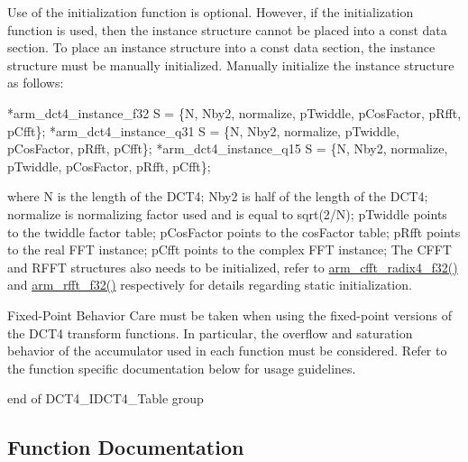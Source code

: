 \begin{DoxyParagraph}{}
Use of the initialization function is optional. However, if the initialization function is used, then the instance structure cannot be placed into a const data section. To place an instance structure into a const data section, the instance structure must be manually initialized. Manually initialize the instance structure as follows\+: 
\begin{DoxyPre}
*arm\_dct4\_instance\_f32 S = \{N, Nby2, normalize, pTwiddle, pCosFactor, pRfft, pCfft\};
*arm\_dct4\_instance\_q31 S = \{N, Nby2, normalize, pTwiddle, pCosFactor, pRfft, pCfft\};
*arm\_dct4\_instance\_q15 S = \{N, Nby2, normalize, pTwiddle, pCosFactor, pRfft, pCfft\};
  \end{DoxyPre}
 where {\ttfamily N} is the length of the D\+C\+T4; {\ttfamily Nby2} is half of the length of the D\+C\+T4; {\ttfamily normalize} is normalizing factor used and is equal to {\ttfamily sqrt(2/N)}; {\ttfamily p\+Twiddle} points to the twiddle factor table; {\ttfamily p\+Cos\+Factor} points to the cos\+Factor table; {\ttfamily p\+Rfft} points to the real F\+FT instance; {\ttfamily p\+Cfft} points to the complex F\+FT instance; The C\+F\+FT and R\+F\+FT structures also needs to be initialized, refer to \hyperlink{group__ComplexFFT_ga521f670cd9c571bc61aff9bec89f4c26}{arm\+\_\+cfft\+\_\+radix4\+\_\+f32()} and \hyperlink{group__RealFFT_ga3df1766d230532bc068fc4ed69d0fcdc}{arm\+\_\+rfft\+\_\+f32()} respectively for details regarding static initialization.
\end{DoxyParagraph}
\begin{DoxyParagraph}{Fixed-\/\+Point Behavior}
Care must be taken when using the fixed-\/point versions of the D\+C\+T4 transform functions. In particular, the overflow and saturation behavior of the accumulator used in each function must be considered. Refer to the function specific documentation below for usage guidelines.
\end{DoxyParagraph}
end of D\+C\+T4\+\_\+\+I\+D\+C\+T4\+\_\+\+Table group 

\subsection{Function Documentation}

